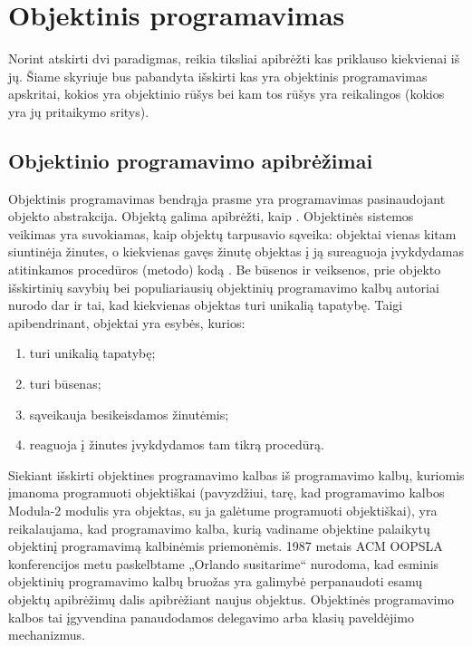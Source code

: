\chapter{Objektinis programavimas}

Norint atskirti dvi paradigmas, reikia tiksliai apibrėžti kas priklauso
kiekvienai iš jų. Šiame skyriuje bus pabandyta išskirti kas yra
objektinis programavimas apskritai, kokios yra objektinio
rūšys bei kam tos rūšys yra reikalingos (kokios yra jų
pritaikymo sritys).

\section{Objektinio programavimo apibrėžimai}

Objektinis programavimas bendrąja prasme yra programavimas
pasinaudojant objekto abstrakcija. Objektą galima apibrėžti, kaip
\cite[41]{OOP-themes-and-variations}. Objektinės sistemos veikimas
yra suvokiamas, kaip objektų tarpusavio sąveika: objektai vienas kitam
siuntinėja žinutes, o kiekvienas gavęs žinutę objektas į ją sureaguoja
įvykdydamas atitinkamos procedūros (metodo)
kodą\cite[41]{OOP-themes-and-variations}%
\cite[277]{concepts-in-programming-languages}%
\cite[168]{Wegner:1987:DOL:38807.38823}.
Be būsenos ir veiksenos, prie objekto išskirtinių savybių 
\cite[37]{cs-beyond-object-oriented-programming} bei
populiariausių objektinių programavimo kalbų autoriai nurodo
dar ir tai, kad kiekvienas objektas turi unikalią tapatybę.
Taigi apibendrinant, objektai yra esybės, kurios:
\begin{enumerate}
  \item turi unikalią tapatybę;
  \item turi būsenas;
  \item sąveikauja besikeisdamos žinutėmis;
  \item reaguoja į žinutes įvykdydamos tam tikrą procedūrą.
\end{enumerate}

Siekiant išskirti objektines programavimo kalbas iš programavimo
kalbų, kuriomis įmanoma programuoti objektiškai (pavyzdžiui,
tarę, kad programavimo kalbos Modula-2 modulis yra objektas,
su ja galėtume programuoti objektiškai), yra reikalaujama, kad
programavimo kalba, kurią vadiname objektine palaikytų objektinį
programavimą kalbinėmis priemonėmis. 1987 metais ACM OOPSLA
konferencijos metu paskelbtame „Orlando susitarime“
\cite{Lieberman:1987:TO:62139.62144} nurodoma, kad esminis
objektinių programavimo kalbų bruožas yra galimybė perpanaudoti
esamų objektų apibrėžimų dalis apibrėžiant naujus objektus.
Objektinės programavimo kalbos tai įgyvendina panaudodamos
delegavimo  arba klasių paveldėjimo 
mechanizmus.

